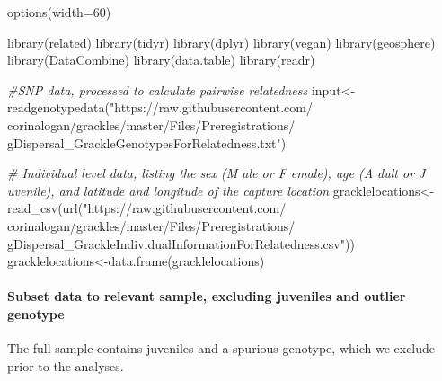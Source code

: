 \documentclass[
]{article}
\newenvironment{Shaded}{\begin{snugshade}}{\end{snugshade}}
\newcommand{\AttributeTok}[1]{\textcolor[rgb]{0.77,0.63,0.00}{#1}}
\newcommand{\CommentTok}[1]{\textcolor[rgb]{0.56,0.35,0.01}{\textit{#1}}}
\newcommand{\DecValTok}[1]{\textcolor[rgb]{0.00,0.00,0.81}{#1}}
\newcommand{\FunctionTok}[1]{\textcolor[rgb]{0.00,0.00,0.00}{#1}}
\newcommand{\NormalTok}[1]{#1}
\newcommand{\OtherTok}[1]{\textcolor[rgb]{0.56,0.35,0.01}{#1}}
\newcommand{\StringTok}[1]{\textcolor[rgb]{0.31,0.60,0.02}{#1}}
\begin{document}
\begin{Shaded}
\begin{Highlighting}[]
\FunctionTok{options}\NormalTok{(}\AttributeTok{width=}\DecValTok{60}\NormalTok{)}

\FunctionTok{library}\NormalTok{(related)}
\FunctionTok{library}\NormalTok{(tidyr)}
\FunctionTok{library}\NormalTok{(dplyr)}
\FunctionTok{library}\NormalTok{(vegan)}
\FunctionTok{library}\NormalTok{(geosphere)}
\FunctionTok{library}\NormalTok{(DataCombine)}
\FunctionTok{library}\NormalTok{(data.table)}
\FunctionTok{library}\NormalTok{(readr) }

\CommentTok{\#SNP data, processed to calculate pairwise relatedness}
\NormalTok{input}\OtherTok{\textless{}{-}}\FunctionTok{readgenotypedata}\NormalTok{(}\StringTok{"https://raw.githubusercontent.com/}
\StringTok{                        corinalogan/grackles/master/Files/Preregistrations/}
\StringTok{                        gDispersal\_GrackleGenotypesForRelatedness.txt"}\NormalTok{)}

\CommentTok{\# Individual level data, listing the sex (M ale or F emale), age (A dult or J uvenile), and latitude and longitude of the capture location}
\NormalTok{gracklelocations}\OtherTok{\textless{}{-}}\FunctionTok{read\_csv}\NormalTok{(}\FunctionTok{url}\NormalTok{(}\StringTok{"https://raw.githubusercontent.com/}
\StringTok{                              corinalogan/grackles/master/Files/Preregistrations/}
\StringTok{                              gDispersal\_GrackleIndividualInformationForRelatedness.csv"}\NormalTok{))}
\NormalTok{gracklelocations}\OtherTok{\textless{}{-}}\FunctionTok{data.frame}\NormalTok{(gracklelocations)}
\end{Highlighting}
\end{Shaded}

\hypertarget{subset-data-to-relevant-sample-excluding-juveniles-and-outlier-genotype}{%
\paragraph{Subset data to relevant sample, excluding juveniles and
outlier
genotype}\label{subset-data-to-relevant-sample-excluding-juveniles-and-outlier-genotype}}

The full sample contains juveniles and a spurious genotype, which we
exclude prior to the analyses.
\end{document}
